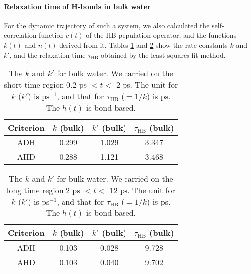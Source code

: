 {\paragraph{Relaxation time of H-bonds in bulk water}\label{rate_const_and_tau_R_128w}
% 
For the dynamic trajectory of such a system, we also calculated the self-correlation function $c(t)$ of the HB population operator, 
and the functions $k(t)$ and $n(t)$ derived from it. 
Tables \ref{tab:k_k_prime_128w_1} and \ref{tab:k_k_prime_128w_2} show the rate constants $k$ and $k'$, and 
the relaxation time $\tau_\text{HB}$ obtained by the least squares fit method. 

%
\begin{table}[H] %
\centering
\caption{\label{tab:k_k_prime_128w_1} 
    The $k$ and $k'$ for bulk water. We carried on the short time region 0.2 ps $< t <$ 2 ps. 
The unit for $k$ ($k'$) is ps$^{-1}$, and that for $\tau_{\text{HB}}$ ($=1/k$) is ps. The $h(t)$ is bond-based.} 
\begin{tabular}{cccc}
 Criterion & $k$  (bulk) & $k'$ (bulk) & $\tau_{\text{HB}}$ (bulk) \\
\hline
  ADH & 0.299  & 1.029 & 3.347   \\
  AHD & 0.288 & 1.121 & 3.468 \\ 
\end{tabular}
\end{table}
%
\begin{table}[H]%
\centering
\caption{\label{tab:k_k_prime_128w_2} 
    The $k$ and $k'$ for bulk water. We carried on the long time region 2 ps $< t <$ 12 ps. 
The unit for $k$ ($k'$) is ps$^{-1}$, and that for $\tau_{\text{HB}}$ ($=1/k$) is ps. The $h(t)$ is bond-based.} 
\begin{tabular}{cccc}
 Criterion & $k$  (bulk) & $k'$ (bulk) & $\tau_{\text{HB}}$ (bulk) \\
\hline
  ADH & 0.103  & 0.028 & 9.728 \\
  AHD & 0.103  & 0.040 & 9.702  \\
\end{tabular}
\end{table}

}
